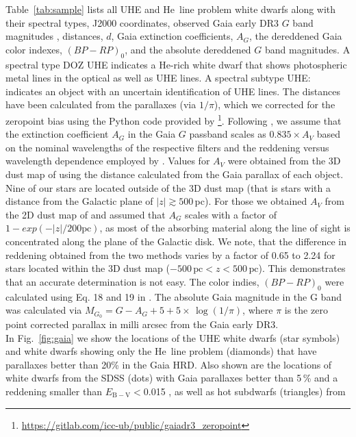 \documentclass{aa}
\newcounter{Rco}
\newcommand{\Ionst}[1]{\setcounter{Rco}{#1}\Roman{Rco}}
\newcommand{\Ion}[2]{\mbox{#1\,{\scriptsize\Ionst{#2}}}}
\newcommand{\ebv}{$E_\mathrm{B-V}$\xspace}
\begin{document}
Table~\ref{tab:sample} lists all UHE and \Ion{He}{2} line problem
white dwarfs along with their spectral
types, J2000 coordinates, observed Gaia early DR3 $G$ band magnitudes
\citep{Gaia+2016, Gaia+2018},
distances, $d$, Gaia extinction coefficients, $A_G$,
the dereddened Gaia color indexes, $(BP-RP)_0$, and the absolute dereddened
$G$ band magnitudes.
A spectral type DOZ UHE indicates a He-rich white dwarf that shows photospheric
metal lines in the optical as well as UHE lines. A spectral subtype UHE:
indicates an object with an uncertain identification of UHE lines.
The distances have been calculated from the parallaxes (via $1/\pi$),
which we corrected for the zeropoint bias using the Python code provided by
\cite{Lindegren+2020}\footnote{\url{https://gitlab.com/icc-ub/public/gaiadr3_zeropoint}}.
Following \cite{GentileFusillo+2019}, we assume that the extinction
coefficient $A_G$ in the Gaia $G$ passband scales as $0.835\times A_V$ based
on the nominal wavelengths of the respective filters and the reddening versus
wavelength dependence employed by \cite{Schlafly2011}. Values for $A_V$ were
obtained from the 3D dust map of \cite{Lallement+2018} using the distance
calculated from the Gaia parallax of each object. Nine of our stars are located outside of
the \cite{Lallement+2018} 3D dust map (that is stars with a distance from the
Galactic plane of $|z|\gtrsim 500$\,pc). For those we obtained $A_V$ from the 2D dust
map of \cite{Schlafly2011} and assumed that $A_G$ scales with a factor of
$1-exp(-|z|/200\mathrm{pc})$, as most of the absorbing
material along the line of sight is concentrated
along the plane of the Galactic disk. We note, that the difference in
reddening obtained from the two methods varies by a factor of 0.65 to 2.24 for stars
located within the 3D dust map ($-500\,\mathrm{pc}<z<500\,\mathrm{pc}$). This
demonstrates that an accurate determination is not easy.
The color indies, $(BP-RP)_0$ were calculated using Eq. 18 and
19 in \cite{GentileFusillo+2019}. The absolute Gaia magnitude in the G band
was calculated via $M_{G_0} =G - A_G+ 5 + 5\times\,\log(1/\pi)$, where $\pi$ is
the zero point corrected parallax in milli arcsec from the Gaia early DR3.\\
In Fig.~\ref{fig:gaia} we show the locations of the UHE white dwarfs
(star symbols) and white dwarfs showing only the \Ion{He}{2} line problem
(diamonds) that have parallaxes better than 20\% in the Gaia
HRD. Also shown are the locations of white dwarfs from
the SDSS (dots) with Gaia parallaxes better than 5\,\% and a reddening smaller than
\ebv$<$0.015 \citep{Gaia+2018}, as well as hot subdwarfs (triangles) from
\end{document}
